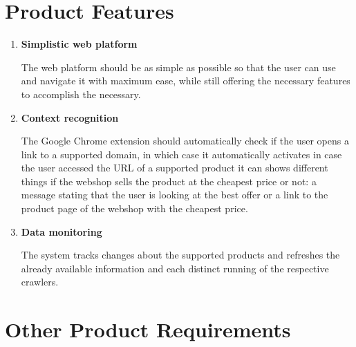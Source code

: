 \documentclass[12pt,a4paper,twoside]{report}
\begin{document}
\section{Product Features}

\begin{enumerate}
  \item \textbf{Simplistic web platform}

        The web platform should be as simple as possible so that the user can use and navigate it with maximum ease, while still offering the necessary features to accomplish the necessary.

  \item \textbf{Context recognition}

        The Google Chrome extension should automatically check if the user opens a link to a supported domain, in which case it automatically activates in case the user accessed the URL of a supported product it can shows different things if the webshop sells the product at the cheapest price or not: a message stating that the user is looking at the best offer or a link to the product page of the webshop with the cheapest price.

  \item \textbf{Data monitoring}

        The system tracks changes about the supported products and refreshes the already available information and each distinct running of the respective crawlers.
\end{enumerate}


\section{Other Product Requirements}
\end{document}
